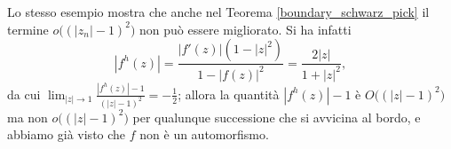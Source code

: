 \begin{oss}
  Lo stesso esempio mostra che anche nel Teorema \ref{boundary_schwarz_pick} il termine $o\bigl((|z_n|-1)^2\bigr)$ non può essere migliorato. Si ha infatti
  $$|f^h(z)|=\frac{|f'(z)|(1-|z|^2)}{1-|f(z)|^2}=\frac{2|z|}{1+|z|^2},$$
  da cui $\displaystyle \lim_{|z| \longrightarrow 1} \frac{|f^h(z)|-1}{(|z|-1)^2}=-\frac{1}{2}$; allora la quantità $|f^h(z)|-1$ è $O\bigl((|z|-1)^2\bigr)$ ma non $o\bigl((|z|-1)^2\bigr)$ per qualunque successione che si avvicina al bordo, e abbiamo già visto che $f$ non è un automorfismo.
\end{oss}
